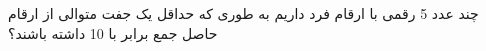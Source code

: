 چند عدد 5 رقمی با ارقام فرد داریم به طوری که حداقل یک جفت متوالی از ارقام حاصل جمع برابر با 10 داشته باشند؟